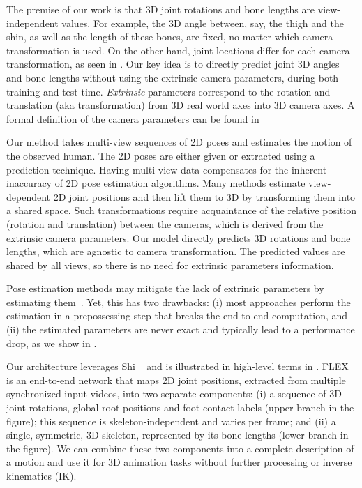 The premise of our work is that 3D joint rotations and bone lengths are view-independent values. 
For example, the 3D angle between, say, the thigh and the shin, as well as the length of these bones, are fixed, no matter which camera transformation is used. On the other hand, joint locations  differ  for each camera transformation, as seen in . 
Our key idea is to directly predict joint 3D angles and bone lengths without using the extrinsic camera parameters, during both training and test time. 
\textit{Extrinsic} parameters correspond to the rotation and translation (aka transformation) from 3D real world axes into 3D camera axes.
A formal definition of the camera parameters can be found in 
\fi

Our method takes multi-view sequences of 2D poses and estimates the motion of the observed human.
The 2D poses are either given or extracted using a prediction technique. Having multi-view data compensates for the inherent inaccuracy of 2D pose estimation algorithms.
Many methods estimate view-dependent 2D joint positions and then lift them to 3D by transforming them into a shared space. Such transformations require acquaintance of the relative position (rotation and translation) between the cameras, which is derived from the extrinsic camera parameters. 
Our model directly predicts 3D rotations and bone lengths, which are agnostic to camera transformation. The predicted values are shared by all views, so there is no need for extrinsic parameters information.

Pose estimation methods may mitigate the lack of extrinsic  parameters by estimating them~\cite{chu_and_pan_semisupervised,kocabas2019selfsupervised}.
Yet, this has two drawbacks: 
(i) most approaches perform the estimation in a prepossessing step that breaks the end-to-end computation, and 
(ii) the estimated parameters are never exact and typically lead to a performance drop, as we show in .

Our architecture leverages Shi \etal~\cite{shi2020motionet} and is illustrated in high-level terms in . FLEX is an end-to-end network that maps 2D joint positions, extracted from multiple synchronized input videos, into two separate components: (i) a sequence of 3D joint rotations, global root positions and foot contact labels (upper branch in the figure); this sequence is skeleton-independent and varies per frame; and (ii) a single, symmetric, 3D skeleton, represented by its bone lengths (lower branch in the figure). We can combine these two components into a complete description of a motion and use it for 3D animation tasks without further processing or inverse kinematics (IK).

